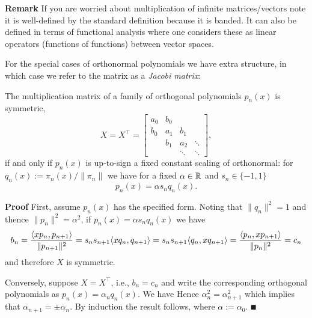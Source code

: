 \textbf{Remark} If you are worried about multiplication of infinite matrices/vectors note it is well-defined by the standard definition because it is banded. It can also be defined in terms of functional analysis where one considers these as linear operators (functions of functions) between vector spaces.

For the special cases of orthonormal polynomials we have extra structure, in which case we refer to the matrix as a \emph{Jacobi matrix}:

\begin{corollary} The multiplication matrix of a family of orthogonal polynomials $p_n(x)$ is symmetric,
\[
X = X^\ensuremath{\top} = \begin{bmatrix} a_0 & b_0 \\
                                                        b_0 & a_1 & b_1\\
                                                        & b_1 & a_2 & \ensuremath{\ddots} \\
                                                        && \ensuremath{\ddots} & \ensuremath{\ddots}
                                                        \end{bmatrix},
\]
if and only if $p_n(x)$ is up-to-sign a fixed constant scaling of orthonormal: for $q_n(x) := \ensuremath{\pi}_n(x)/\|\ensuremath{\pi}_n\|$ we have for a fixed $\alpha \in {\mathbb R}$ and $s_n \ensuremath{\in} \{-1,1\}$
\[
p_n(x) = \ensuremath{\alpha} s_n q_n(x).
\]
\end{corollary}
\textbf{Proof} First, assume $p_n(x)$ has the specified form. Noting that $\|q_n\|^2 = 1$ and thence $\|p_n\|^2 = \ensuremath{\alpha}^2$, if $p_n(x) = \ensuremath{\alpha} s_n q_n(x)$ we have
\[
b_n = {\ensuremath{\langle}xp_n, p_{n+1}\ensuremath{\rangle} \over \|p_{n+1}\|^2} = s_n s_{n+1} \ensuremath{\langle}x q_n, q_{n+1}\ensuremath{\rangle} =
s_n s_{n+1} \ensuremath{\langle}q_n, x q_{n+1}\ensuremath{\rangle} = {\ensuremath{\langle}p_n, xp_{n+1}\ensuremath{\rangle} \over \|p_n\|^2} = c_{n}
\]
and therefore $X$ is symmetric.

Conversely, suppose $X = X^\ensuremath{\top}$, i.e., $b_n = c_{n}$ and write the corresponding orthogonal polynomials as $p_n(x) = \ensuremath{\alpha}_n q_n(x)$. We have
Hence $\ensuremath{\alpha}_n^2 = \ensuremath{\alpha}_{n+1}^2$ which implies that $\ensuremath{\alpha}_{n+1} = \ensuremath{\pm} \ensuremath{\alpha}_n$. By induction the result follows, where $\ensuremath{\alpha} := \ensuremath{\alpha}_0$. \ensuremath{\QED}


